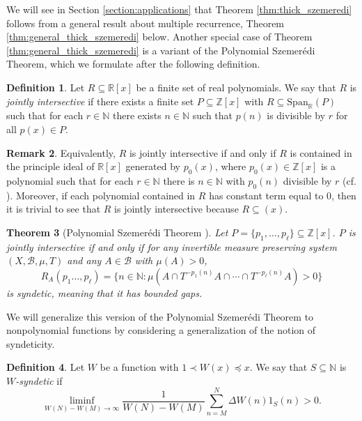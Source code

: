 \documentclass[12pt]{article}
\theoremstyle{plain} %
\newtheorem{theorem}{Theorem}[section]
\theoremstyle{definition} %
\newtheorem{definition}[theorem]{Definition}
\newtheorem{remark}[theorem]{Remark}
\theoremstyle{plain}
\theoremstyle{plain}
\numberwithin{equation}{section}
\newcommand{\N}{\mathbb{N}}
\newcommand{\Z}{\mathbb{Z}}
\newcommand{\R}{\mathbb{R}}
\renewcommand{\subset}{\subseteq}
\newcommand{\1}{\mathbbm{1}}
\newcommand{\oo}{\infty}
\begin{document}
We will see in Section \ref{section:applications} that Theorem \ref{thm:thick_szemeredi} follows from a general result about multiple recurrence, Theorem \ref{thm:general_thick_szemeredi} below. Another special case of Theorem \ref{thm:general_thick_szemeredi} is a variant of the Polynomial Szemer\'{e}di Theorem, which we formulate after the following definition.
\begin{definition}
 Let $R\subset \R[x]$ be a finite set of real polynomials. We say that $R$ is \emph{jointly intersective} if there exists a finite set $P\subset \Z[x]$ with $R\subset \text{Span}_{\mathbb{R}}(P)$ such that for each $r\in \N$ there exists $n\in \N$ such that $p(n)$ is divisible by $r$ for all $p(x)\in P$. 
\end{definition}
\begin{remark}
    Equivalently, $R$ is jointly intersective if and only if $R$ is contained in the principle ideal of $\R[x]$ generated by $p_0(x)$, where $p_0(x)\in \Z[x]$ is a polynomial such that for each $r\in \N$ there is $n\in \N$ with $p_0(n)$ divisible by $r$ (cf. \cite[Proposition 6.1]{BLL08}). Moreover, if each polynomial contained in $R$ has constant term equal to $0$, then it is trivial to see that $R$ is jointly intersective because $R\subset (x)$.
\end{remark}

\begin{theorem}[Polynomial Szemer\'edi Theorem \cite{BLL08}]\label{thm:polynomial_sz}
    Let $P= \{p_1,\dots, p_{\ell}\}\subset \Z[x]$. $P$ is jointly intersective if and only if for any invertible measure preserving system $(X,\mathscr{B},\mu,T)$ and any $A\in \mathscr{B}$ with $\mu(A)>0$, 
\begin{equation}\label{eq:polynomial_sz}
R_A(p_1\dots, p_{\ell})=\{n\in \N: \mu(A\cap T^{-p_1(n)}A\cap\cdots \cap T^{-p_{\ell}(n)}A)>0\}
\end{equation}
is {syndetic}, meaning that it has bounded gaps.
\end{theorem}


We will generalize this version of the Polynomial Szemer\'{e}di Theorem to nonpolynomial functions by considering a generalization of the notion of syndeticity.

\begin{definition}\label{def:W_syndetic}
    Let $W$ be a function with $1\prec W(x)\preceq x$. We say that $S\subset \N$ is $W$\emph{-syndetic} if 
    \begin{equation}
        \liminf_{W(N)-W(M)\to\oo}\frac{1}{W(N)-W(M)}\sum_{n=M}^N\Delta W(n)1_{S}(n)>0.
    \end{equation}
\end{definition}
\end{document}
